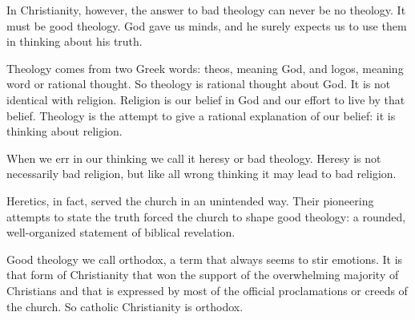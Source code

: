 In Christianity, however, the answer to bad theology can never be no theology. It must be good
theology. God gave us minds, and he surely expects us to use them in thinking about his truth.

Theology comes from two Greek words: theos, meaning God, and logos, meaning word or rational
thought. So theology is rational thought about God. It is not identical with religion. Religion is
our belief in God and our effort to live by that belief. Theology is the attempt to give a rational
explanation of our belief: it is thinking about religion.

When we err in our thinking we call it heresy or bad theology. Heresy is not necessarily bad
religion, but like all wrong thinking it may lead to bad religion.

Heretics, in fact, served the church in an unintended way. Their pioneering attempts to state the
truth forced the church to shape good theology: a rounded, well-organized statement of biblical
revelation.

Good theology we call orthodox, a term that always seems to stir emotions. It is that form of
Christianity that won the support of the overwhelming majority of Christians and that is expressed
by most of the official proclamations or creeds of the church. So catholic Christianity is orthodox.

